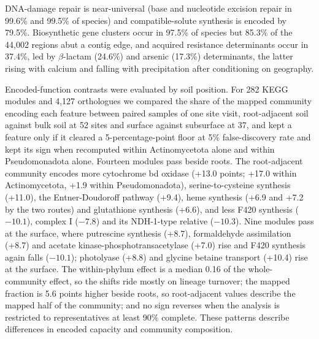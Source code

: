 \documentclass[11pt]{article}
\begin{document}
DNA-damage repair
is near-universal (base and nucleotide excision repair in 99.6\% and 99.5\% of species) and
compatible-solute synthesis is encoded by 79.5\%. Biosynthetic gene clusters occur in 97.5\% of
species but 85.3\% of the 44{,}002 regions abut a contig edge, and acquired resistance determinants
occur in 37.4\%, led by $\beta$-lactam (24.6\%) and arsenic (17.3\%) determinants, the latter rising
with calcium and falling with precipitation after conditioning on geography.

Encoded-function contrasts were evaluated by soil position. For 282 KEGG modules and 4{,}127
orthologues we compared the share of the mapped community encoding each feature between paired
samples of one site visit, root-adjacent soil against bulk soil at 52 sites and surface against
subsurface at 37, and kept a feature only if it cleared a 5-percentage-point floor at 5\%
false-discovery rate and kept its sign when recomputed within Actinomycetota alone and within
Pseudomonadota alone. Fourteen modules pass beside roots. The root-adjacent community encodes more
cytochrome bd oxidase (+13.0 points; +17.0 within Actinomycetota, +1.9 within Pseudomonadota),
serine-to-cysteine synthesis (+11.0), the Entner-Doudoroff pathway (+9.4), heme synthesis (+6.9 and
+7.2 by the two routes) and glutathione synthesis (+6.6), and less F420 synthesis ($-10.1$), complex I
($-7.8$) and its NDH-1-type relative ($-10.3$).
Nine modules pass at
the surface, where putrescine synthesis (+8.7), formaldehyde assimilation (+8.7) and acetate
kinase-phosphotransacetylase (+7.0) rise and F420 synthesis again falls ($-10.1$); photolyase
(+8.8) and glycine betaine transport (+10.4) rise at the surface. The within-phylum effect is a
median 0.16 of the whole-community effect, so the shifts ride mostly on lineage turnover; the mapped
fraction is 5.6 points higher beside roots, so root-adjacent values describe the mapped half of the
community; and no sign reverses when the analysis is restricted to representatives at least 90\%
complete. These patterns describe differences in encoded capacity and community composition.
\end{document}
